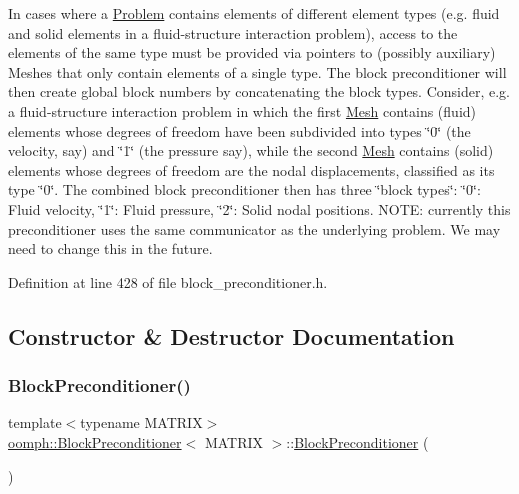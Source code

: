 In cases where a {\ttfamily \hyperlink{classoomph_1_1Problem}{Problem}} contains elements of different element types (e.\+g. fluid and solid elements in a fluid-\/structure interaction problem), access to the elements of the same type must be provided via pointers to (possibly auxiliary) {\ttfamily Meshes} that only contain elements of a single type. The block preconditioner will then create global block numbers by concatenating the block types. Consider, e.\+g. a fluid-\/structure interaction problem in which the first {\ttfamily \hyperlink{classoomph_1_1Mesh}{Mesh}} contains (fluid) elements whose degrees of freedom have been subdivided into types \char`\"{}0\char`\"{} (the velocity, say) and \char`\"{}1\char`\"{} (the pressure say), while the second {\ttfamily \hyperlink{classoomph_1_1Mesh}{Mesh}} contains (solid) elements whose degrees of freedom are the nodal displacements, classified as its type \char`\"{}0\char`\"{}. The combined block preconditioner then has three \char`\"{}block types\char`\"{}\+: \char`\"{}0\char`\"{}\+: Fluid velocity, \char`\"{}1\char`\"{}\+: Fluid pressure, \char`\"{}2\char`\"{}\+: Solid nodal positions. N\+O\+TE\+: currently this preconditioner uses the same communicator as the underlying problem. We may need to change this in the future. 

Definition at line 428 of file block\+\_\+preconditioner.\+h.



\subsection{Constructor \& Destructor Documentation}
\mbox{\label{classoomph_1_1BlockPreconditioner_a74c4b4bef4371b72816631445689a2e6}} 
\subsubsection{\texorpdfstring{Block\+Preconditioner()}{BlockPreconditioner()}\hspace{0.1cm}{\footnotesize\ttfamily [1/2]}}
{\footnotesize\ttfamily template$<$typename M\+A\+T\+R\+IX$>$ \\
\hyperlink{classoomph_1_1BlockPreconditioner}{oomph\+::\+Block\+Preconditioner}$<$ M\+A\+T\+R\+IX $>$\+::\hyperlink{classoomph_1_1BlockPreconditioner}{Block\+Preconditioner} (\begin{DoxyParamCaption}{ }\end{DoxyParamCaption})\hspace{0.3cm}{\ttfamily [inline]}}



